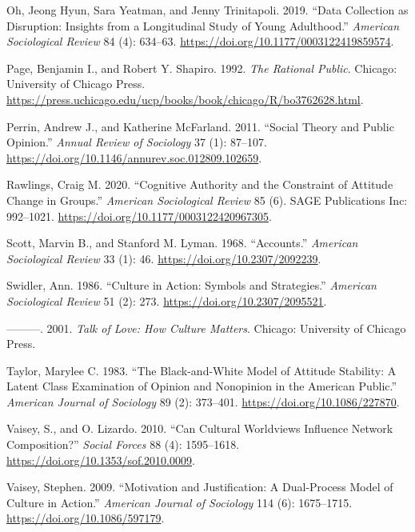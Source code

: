 \documentclass[12pt,]{article}
\begin{document}
\leavevmode\hypertarget{ref-oh2019}{}%
Oh, Jeong Hyun, Sara Yeatman, and Jenny Trinitapoli. 2019. ``Data Collection as Disruption: Insights from a Longitudinal Study of Young Adulthood.'' \emph{American Sociological Review} 84 (4): 634--63. \url{https://doi.org/10.1177/0003122419859574}.

\leavevmode\hypertarget{ref-page1992}{}%
Page, Benjamin I., and Robert Y. Shapiro. 1992. \emph{The Rational Public}. Chicago: University of Chicago Press. \url{https://press.uchicago.edu/ucp/books/book/chicago/R/bo3762628.html}.

\leavevmode\hypertarget{ref-perrin2011}{}%
Perrin, Andrew J., and Katherine McFarland. 2011. ``Social Theory and Public Opinion.'' \emph{Annual Review of Sociology} 37 (1): 87--107. \url{https://doi.org/10.1146/annurev.soc.012809.102659}.

\leavevmode\hypertarget{ref-rawlings2020}{}%
Rawlings, Craig M. 2020. ``Cognitive Authority and the Constraint of Attitude Change in Groups.'' \emph{American Sociological Review} 85 (6). SAGE Publications Inc: 992--1021. \url{https://doi.org/10.1177/0003122420967305}.

\leavevmode\hypertarget{ref-scott1968}{}%
Scott, Marvin B., and Stanford M. Lyman. 1968. ``Accounts.'' \emph{American Sociological Review} 33 (1): 46. \url{https://doi.org/10.2307/2092239}.

\leavevmode\hypertarget{ref-swidler1986}{}%
Swidler, Ann. 1986. ``Culture in Action: Symbols and Strategies.'' \emph{American Sociological Review} 51 (2): 273. \url{https://doi.org/10.2307/2095521}.

\leavevmode\hypertarget{ref-swidler2001}{}%
---------. 2001. \emph{Talk of Love: How Culture Matters}. Chicago: University of Chicago Press.

\leavevmode\hypertarget{ref-taylor1983}{}%
Taylor, Marylee C. 1983. ``The Black-and-White Model of Attitude Stability: A Latent Class Examination of Opinion and Nonopinion in the American Public.'' \emph{American Journal of Sociology} 89 (2): 373--401. \url{https://doi.org/10.1086/227870}.

\leavevmode\hypertarget{ref-vaisey2010}{}%
Vaisey, S., and O. Lizardo. 2010. ``Can Cultural Worldviews Influence Network Composition?'' \emph{Social Forces} 88 (4): 1595--1618. \url{https://doi.org/10.1353/sof.2010.0009}.

\leavevmode\hypertarget{ref-vaisey2009}{}%
Vaisey, Stephen. 2009. ``Motivation and Justification: A Dual‐Process Model of Culture in Action.'' \emph{American Journal of Sociology} 114 (6): 1675--1715. \url{https://doi.org/10.1086/597179}.
\end{document}
